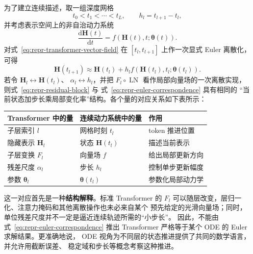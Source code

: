 为了建立连续描述，取一组深度网格
\[
    t_0<t_1<\cdots<t_L,
    \qquad
    h_l=t_{l+1}-t_l,
\]
并考虑表示空间上的非自治动力系统
\begin{equation}
    \frac{\mathrm{d}\boldsymbol{H}(t)}{\mathrm{d}t}
    =
    f\!\left(
        \boldsymbol{H}(t),t;
        \boldsymbol{\theta}(t)
    \right).
    \label{eq:repr-transformer-vector-field}
\end{equation}
对式~\eqref{eq:repr-transformer-vector-field} 在
\([t_l,t_{l+1}]\) 上作一次显式 Euler 离散化，可得
\begin{equation}
    \boldsymbol{H}(t_{l+1})
    \approx
    \boldsymbol{H}(t_l)
    +
    h_l
    f\!\left(
        \boldsymbol{H}(t_l),t_l;
        \boldsymbol{\theta}(t_l)
    \right).
    \label{eq:repr-euler-correspondence}
\end{equation}
若令
\(\boldsymbol{H}_{l}\leftrightarrow\boldsymbol{H}(t_l)\)、
\(\alpha_l\leftrightarrow h_l\)，并把
\(F_l\circ\operatorname{LN}\) 看作局部向量场的一次离散实现，
则式~\eqref{eq:repr-residual-block} 与
式~\eqref{eq:repr-euler-correspondence} 具有相同的
“当前状态加步长乘局部变化率”结构。各个量的对应关系如下表所示：
\begin{center}
\begin{tabular}{lll}
    \toprule
    Transformer 中的量 & 连续动力系统中的量 & 作用 \\
    \midrule
    子层索引 \(l\) & 网格时刻 \(t_l\) & token 推进位置 \\
    隐藏表示 \(\boldsymbol{H}_l\) & 状态 \(\boldsymbol{H}(t_l)\) & 描述当前表示 \\
    子层变换 \(F_l\) & 向量场 \(f\) & 给出局部更新方向 \\
    残差尺度 \(\alpha_l\) & 步长 \(h_l\) & 控制单步更新幅度 \\
    参数 \(\boldsymbol{\theta}_l\) & \(\boldsymbol{\theta}(t_l)\) & 参数化局部动力学 \\
    \bottomrule
\end{tabular}
\end{center}

这一对应首先是一种\textbf{结构解释}。标准 Transformer 的
\(F_l\) 可以随层改变，层归一化、注意力掩码和其他离散操作也未必来自某个
预先给定的光滑向量场；同时，单位残差尺度并不一定是逼近连续轨迹所需的“小步长”。
因此，不能由式~\eqref{eq:repr-euler-correspondence} 推出
Transformer 严格等于某个 ODE 的 Euler 求解结果。更准确地说，
ODE 视角为不同层的状态推进提供了共同的数学语言，并允许用截断误差、
稳定域和步长等概念考察这种推进。

